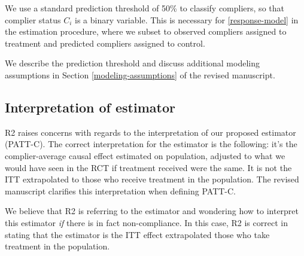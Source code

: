 \documentclass[hidelinks,12pt,letterpaper]{article}
\begin{document}
We use a standard prediction threshold of 50\% to classify compliers, so that complier status $C_i$ is a binary variable. This is necessary for \ref{response-model} in the estimation procedure, where we subset to observed compliers assigned to treatment and predicted compliers assigned to control. 

We describe the prediction threshold and discuss additional modeling assumptions in Section \ref{modeling-assumptions} of the revised manuscript. 

\subsection{Interpretation of estimator}\label{interpret}


R2 raises concerns with regards to the interpretation of our proposed estimator (PATT-C). The correct interpretation for the estimator is the following: it's the complier-average causal effect estimated on population, adjusted to what we would have seen in the RCT if treatment received were the same. It is not the ITT extrapolated to those who receive treatment in the population. The revised manuscript clarifies this interpretation when defining PATT-C. 

We believe that R2 is referring to the \citet{Hartman} estimator and wondering how to interpret this estimator \emph{if} there is in fact non-compliance. In this case, R2 is correct in stating that the \citet{Hartman} estimator is the ITT effect extrapolated those who take treatment in the population. 
\end{document}
